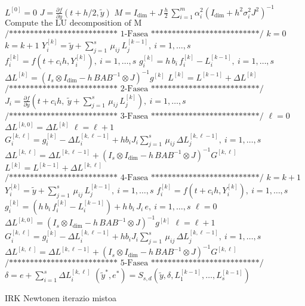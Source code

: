  \begin{algorithm}[H]
  \BlankLine
    $L^{[0]} = 0$\;
    $J= \frac{\partial f}{\partial y}(t +h/2,\tilde y)$\;
    $M = I_\dim + J\, \frac{h}{2} \, \sum_{i=1}^m \alpha_i^2 (I_\dim +  h^2 \sigma_i^2 J^2)^{-1}$\;
    \BlankLine
    $\text{Compute the LU decomposition of M}$\;
    \BlankLine
    $\text{/************************** 1-Fasea **************************/}$\;
    \BlankLine
    $k=0$\;
   {
    \BlankLine
    $k=k+1$\;        
    $Y_{i}^{[k]} = \tilde y+\sum_{j=1}^{s}\, \mu_{ij}\, L_{j}^{[k-1]}, \ i=1,\dots,s$\; 
    $f_{i}^{[k]} =  f\left(t+c_i h, Y_{i}^{[k]} \right), \ i=1,\dots,s$\;
    $g_i^{[k]} =h \, b_i\,f_i^{[k]} -L_i^{[k-1]}, \ i=1,\dots,s$\;
    $\Delta L^{[k]} =\left(I_s \otimes I_\dim  - h \, B A B^{-1} \otimes J \right)^{-1} g^{[k]}$\;
    $L^{[k]} = L^{[k-1]} + \Delta L^{[k]}$\;    
            \BlankLine
   }
   \BlankLine
    $\text{/************************** 2-Fasea **************************/}$\;
   \BlankLine 
    $J_i= \frac{\partial f}{\partial y}\left(t + c_i h, \ \tilde y+\sum_{j=1}^{s}\, \mu_{ij}\, L_{j}^{[k]}\right), \ i=1,\dots,s$\;
   \BlankLine 
    $\text{/************************** 3-Fasea **************************/}$\;
   \BlankLine
    $ \ell=0$\;
    $\Delta L^{[k,0]} =  \Delta L^{[k]}$\;
    {
    \BlankLine
    $\ell=\ell+1$\;
    $ G_i^{[k,\ell]} = g_i^{[k]} - \Delta L_{i}^{[k,\ell-1]}  + h b_i J_i \sum_{j=1}^{s}\, \mu_{ij} \, \Delta L_{j}^{[k,\ell-1]}, \ i=1,\dots,s$\;
    $\Delta L^{[k,\ell]} =\Delta L^{[k,\ell-1]} + \left(
         I_s \otimes I_\dim  - h \, B  A B^{-1} \otimes J \right)^{-1} 
          G^{[k,\ell]}$\;       
     \BlankLine
   }
    $L^{[k]} = L^{[k-1]} + \Delta L^{[k,\ell]}$\;    
    \BlankLine 
    $\text{/************************** 4-Fasea **************************/}$\;
    \BlankLine
    $k=k+1$\;
    $Y_{i}^{[k]} = \tilde y+ \sum_{j=1}^{s}\, \mu_{ij}\, L_{j}^{[k-1]}, \ i=1,\dots,s$\;
    $f_{i}^{[k]} =  f\left(t+c_i h, Y_{i}^{[k]} \right), \ i=1,\dots,s$\;
    $g_i^{[k]} = \left(h \, b_i\,f_i^{[k]} -L_i^{[k-1]} \right) + h \, b_i \, J_i \, e, \ i=1,\dots,s$\;
    \BlankLine
    $ \ell=0$\;
    $\Delta L^{[k,0]} =\left(
    I_s \otimes I_\dim  - h \, B A B^{-1} \otimes J \right)^{-1} g^{[k]}$\;
    {
    \BlankLine
    $\ell=\ell+1$\;
    $ G_i^{[k,\ell]} = g_i^{[k]} - \Delta L_{i}^{[k,\ell-1]}  + h b_i J_i \sum_{j=1}^{s}\, \mu_{ij} \, \Delta L_{j}^{[k,\ell-1]}, \ i=1,\dots,s$\;
    $\Delta L^{[k,\ell]} =\Delta L^{[k,\ell-1]} + \left(
         I_s \otimes I_\dim  - h \, B A B^{-1} \otimes J \right)^{-1} 
          G^{[k,\ell]}$\;       
    \BlankLine
    }
   \BlankLine 
    $\text{/************************** 5-Fasea **************************/}$\;
    \BlankLine
     $\delta = e + \sum_{i=1}^{s} \Delta L_i^{[k,\ell]}$\;
     $(\tilde y^*,e^*) = S_{s,d}(\tilde y, \delta, L_1^{[k-1]}, \ldots, L_s^{[k-1]})$\;
    \BlankLine
  \caption{IRK  Newtonen iterazio mistoa}
  \label{alg:IRKstep}
 \end{algorithm}

